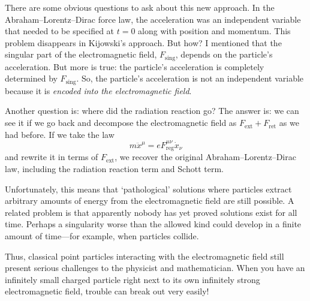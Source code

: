 \documentclass{article}
\newcommand{\ret}{\mathrm{ret}}
\newcommand{\ext}{\mathrm{ext}}
\newcommand{\sing}{\mathrm{sing}}
\newcommand{\reg}{\mathrm{reg}}
\begin{document}
There are some obvious questions to ask about this new approach.  In the Abraham--Lorentz--Dirac force law, the acceleration was an independent variable that needed to be specified at $t = 0$ along with position and momentum.   This problem disappears in Kijowski's approach.  But how?  I mentioned that the singular part of the electromagnetic field, $F_\sing$, depends on the particle's acceleration.  But more is true: the particle's acceleration is completely determined by $F_\sing$.  So, the particle's acceleration is not an independent variable because it is \emph{encoded into the electromagnetic field}.

Another question is: where did the radiation reaction go?  The answer is: we can see it if we go back and decompose the electromagnetic field as $F_\ext + F_\ret$ as we had before.   If we take the law
\[    m \ddot{x}^\mu = e F_{\reg}^{\mu \nu} \dot{x}_\nu  \]
and rewrite it in terms of $F_\ext$, we recover the original Abraham--Lorentz--Dirac
law, including the radiation reaction term and Schott term.

Unfortunately, this means that `pathological' solutions where particles extract arbitrary amounts of energy from the electromagnetic field are still possible.   A related problem
is that apparently nobody has yet proved solutions exist for all time.  Perhaps a singularity worse than the allowed kind could develop in a finite amount of time---for example, when particles collide.  

Thus, classical point particles interacting with the electromagnetic field still present serious challenges to the physicist and mathematician. When you have an infinitely small charged particle right next to its own infinitely strong electromagnetic field, trouble can break out very easily!
\end{document}
